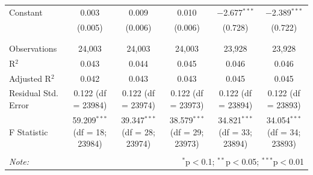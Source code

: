 \documentclass[a4paper,12pt]{article}
\begin{document}
\begin{table}[!htbp]
{\begin{tabular}{@{\extracolsep{5pt}}lccccc}
 Constant & 0.003 & 0.009 & 0.010 & $-$2.677$^{***}$ & $-$2.389$^{***}$ \\ 
  & (0.005) & (0.006) & (0.006) & (0.728) & (0.722) \\ 
  & & & & & \\ 
\hline \\[-1.8ex] 
Observations & 24,003 & 24,003 & 24,003 & 23,928 & 23,928 \\ 
R$^{2}$ & 0.043 & 0.044 & 0.045 & 0.046 & 0.046 \\ 
Adjusted R$^{2}$ & 0.042 & 0.043 & 0.043 & 0.045 & 0.045 \\ 
Residual Std. Error & 0.122 (df = 23984) & 0.122 (df = 23974) & 0.122 (df = 23973) & 0.122 (df = 23894) & 0.122 (df = 23893) \\ 
F Statistic & 59.209$^{***}$ (df = 18; 23984) & 39.347$^{***}$ (df = 28; 23974) & 38.579$^{***}$ (df = 29; 23973) & 34.821$^{***}$ (df = 33; 23894) & 34.054$^{***}$ (df = 34; 23893) \\ 
\hline 
\hline \\[-1.8ex] 
\textit{Note:}  & \multicolumn{5}{r}{$^{*}$p$<$0.1; $^{**}$p$<$0.05; $^{***}$p$<$0.01} \\ 
\end{tabular} }
\end{table} 

\end{document}
